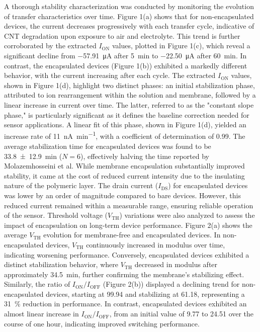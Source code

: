 {%
A thorough stability characterization was conducted by monitoring the evolution of transfer characteristics over time. Figure 1(a) shows that for non-encapsulated devices, the current decreases progressively with each transfer cycle, indicative of CNT degradation upon exposure to air and electrolyte. This trend is further corroborated by the extracted $I_{\text{ON}}$ values, plotted in Figure 1(c), which reveal a significant decline from \SI{-57.91}{\micro\ampere} after \SI{5}{\minute} to \SI{-22.50}{\micro\ampere} after \SI{60}{\minute}. In contrast, the encapsulated devices (Figure 1(b)) exhibited a markedly different behavior, with the current increasing after each cycle. The extracted $I_{\text{ON}}$ values, shown in Figure 1(d), highlight two distinct phases: an initial stabilization phase, attributed to ion rearrangement within the solution and membrane, followed by a linear increase in current over time. The latter, referred to as the "constant slope phase," is particularly significant as it defines the baseline correction needed for sensor applications. A linear fit of this phase, shown in Figure 1(d), yielded an increase rate of \SI{11}{\nano\ampere\per\minute}, with a coefficient of determination of \SI{0.99}{}. The average stabilization time for encapsulated devices was found to be \SI{33.8 \pm 12.9}{\minute} ($N=6$), effectively halving the time reported by Molazemhosseini et al.  
%
While membrane encapsulation substantially improved stability, it came at the cost of reduced current intensity due to the insulating nature of the polymeric layer. The drain current ($I_{\text{DS}}$) for encapsulated devices was lower by an order of magnitude compared to bare devices. However, this reduced current remained within a measurable range, ensuring reliable operation of the sensor.  
%
Threshold voltage ($V_{\text{TH}}$) variations were also analyzed to assess the impact of encapsulation on long-term device performance. Figure 2(a) shows the average $V_{\text{TH}}$ evolution for membrane-free and encapsulated devices. In non-encapsulated devices, $V_{\text{TH}}$ continuously increased in modulus over time, indicating worsening performance. Conversely, encapsulated devices exhibited a distinct stabilization behavior, where $V_{\text{TH}}$ decreased in modulus after approximately \SI{34.5}{\minute}, further confirming the membrane’s stabilizing effect. Similarly, the ratio of $I_{\text{ON}}/I_{\text{OFF}}$ (Figure 2(b)) displayed a declining trend for non-encapsulated devices, starting at \num{99.94} and stabilizing at \num{61.18}, representing a \SI{31}{\percent} reduction in performance. In contrast, encapsulated devices exhibited an almost linear increase in $I_{\text{ON}}/I_{\text{OFF}}$, from an initial value of \num{9.77} to \num{24.51} over the course of one hour, indicating improved switching performance.  
}
